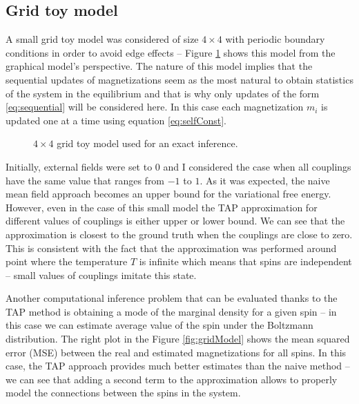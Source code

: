 \subsection{Grid toy model}
A small grid toy model was considered of size $4 \times 4$ with periodic boundary conditions in order to avoid edge effects -- Figure \ref{fig:grid} shows this model from the graphical model's perspective. The nature of this model implies that the sequential updates of magnetizations seem as the most natural to obtain statistics of the system in the equilibrium and that is why only updates of the form \ref{eq:sequential} will be considered here. In this case each magnetization $m_i$ is updated one at a time using equation \ref{eq:selfConst}.

\begin{figure}[!htb]
\begin{center}

\end{center}
  \caption[Grid toy model]{$4 \times 4$ grid toy model used for an exact inference.}
    \label{fig:grid}
\end{figure}

Initially, external fields were set to $0$ and I considered the case when all couplings have the same value that ranges from $-1$ to $1$. As it was expected, the naive mean field approach becomes an upper bound for the variational free energy. However, even in the case of this small model the TAP approximation for different values of couplings is either upper or lower bound. We can see that the approximation is closest to the ground truth when the couplings are close to zero. This is consistent with the fact that the approximation was performed around point where the temperature $T$ is infinite which means that spins are independent -- small values of couplings imitate this state.

Another computational inference problem that can be evaluated thanks to the TAP method is obtaining a mode of the marginal density for a given spin -- in this case we can estimate average value of the spin under the Boltzmann distribution. The right plot in the Figure \ref{fig:gridModel} shows the mean squared error (MSE) between the real and estimated magnetizations for all spins. In this case, the TAP approach provides much better estimates than the naive method -- we can see that adding a second term to the approximation allows to properly model the connections between the spins in the system. 

